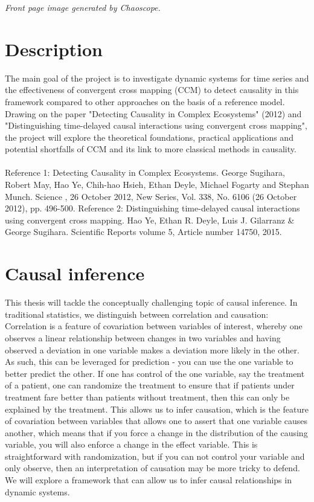 \documentclass[11pt, a4paper]{memoir}
\subtitle{Convergent Cross Mapping and Alternative Approaches}
\theoremstyle{plain}
\theoremstyle{definition}
\begin{document}
\begingroup
  \selectfont
  \maketitle
  \textit{Front page image generated by Chaoscope.}
\endgroup

\section{Description}
The main goal of the project is to investigate dynamic systems for time series and the effectiveness of convergent cross mapping (CCM) to detect causality in this framework compared to other approaches on the basis of a reference model. Drawing on the paper "Detecting Causality in Complex Ecosystems" (2012) and "Distinguishing time-delayed causal interactions using convergent cross mapping", the project will explore the theoretical foundations, practical applications and potential shortfalls of CCM and its link to more classical methods in causality.\\\\
Reference 1: Detecting Causality in Complex Ecosystems. George Sugihara, Robert May, Hao Ye, Chih-hao Hsieh, Ethan Deyle, Michael Fogarty and Stephan Munch. Science , 26 October 2012, New Series, Vol. 338, No. 6106 (26 October 2012), pp. 496-500.
Reference 2: Distinguishing time-delayed causal interactions using convergent cross mapping. Hao Ye, Ethan R. Deyle, Luis J. Gilarranz \& George Sugihara. Scientific Reports volume 5, Article number 14750, 2015.
\newpage

\tableofcontents

\normalem

\section{Causal inference}
This thesis will tackle the conceptually challenging topic of causal inference. In traditional statistics, we distinguish between correlation and causation: Correlation is a feature of covariation between variables of interest, whereby one observes a linear relationship between changes in two variables and having observed a deviation in one variable makes a deviation more likely in the other. As such, this can be leveraged for prediction - you can use the one variable to better predict the other. If one has control of the one variable, say the treatment of a patient, one can randomize the treatment to ensure that if patients under treatment fare better than patients without treatment, then this can only be explained by the treatment. This allows us to infer causation, which is the feature of covariation between variables that allows one to assert that one variable causes another, which means that if you force a change in the distribution of the causing variable, you will also enforce a change in the effect variable. This is straightforward with randomization, but if you can not control your variable and only observe, then an interpretation of causation may be more tricky to defend. We will explore a framework that can allow us to infer causal relationships in dynamic systems.
\end{document}
